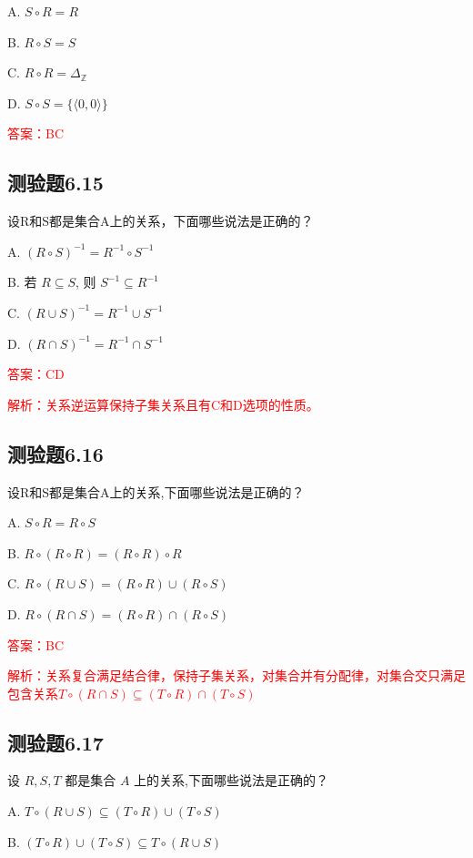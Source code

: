 \documentclass[UTF8, heading=true]{ctexart}
\begin{document}
A. $S \circ R=R$

B. $R \circ S=S$

C. $R \circ R=\Delta_{\mathbb{Z}}$

D. $S \circ S=\{\langle 0,0\rangle\}$

\textcolor{red}{答案：BC}

\subsection{测验题6.15}

设R和S都是集合A上的关系，下面哪些说法是正确的？

A. $(R \circ S)^{-1}=R^{-1} \circ S^{-1}$

B. 若 $R \subseteq S$, 则 $S^{-1} \subseteq R^{-1}$

C. $(R \cup S)^{-1}=R^{-1} \cup S^{-1}$

D. $(R \cap S)^{-1}=R^{-1} \cap S^{-1}$

\textcolor{red}{答案：CD}

\textcolor{red}{解析：关系逆运算保持子集关系且有C和D选项的性质。}

\subsection{测验题6.16}

设R和S都是集合A上的关系,下面哪些说法是正确的？

A. $S \circ R=R \circ S$

B. $R \circ(R \circ R)=(R \circ R) \circ R$

C. $R \circ(R \cup S)=(R \circ R) \cup(R \circ S)$

D. $R \circ(R \cap S)=(R \circ R) \cap(R \circ S)$

\textcolor{red}{答案：BC}

\textcolor{red}{解析：关系复合满足结合律，保持子集关系，对集合并有分配律，对集合交只满足包含关系$T \circ (R \cap S) \subseteq (T \circ R) \cap (T \circ S)$}



\subsection{测验题6.17}

设 $R, S, T$ 都是集合 $A$ 上的关系,下面哪些说法是正确的？

A. $T \circ (R \cup S) \subseteq (T \circ R) \cup (T \circ S)$

B. $ (T \circ R) \cup (T \circ S) \subseteq T \circ (R \cup S)$
\end{document}
